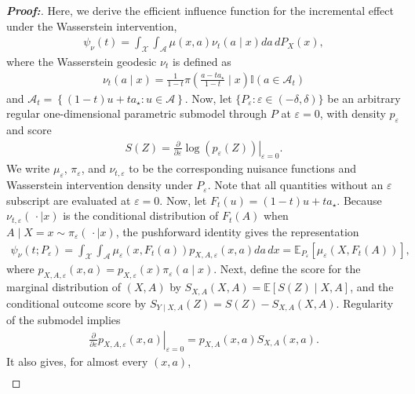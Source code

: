 \documentclass[11pt,twoside]{article}
\theoremstyle{definition}
\theoremstyle{remark}
\begin{document}
\begin{proof}[\textbf{Proof:}] Here, we derive the efficient influence function for the incremental effect under the Wasserstein intervention,
\begin{align*}
    \psi_\nu(t) = \int_{\mathcal{X}} \int_{\mathcal{A}} \mu(x, a) \nu_t(a \! \mid \! x) da \, dP_X(x),
\end{align*}
where the Wasserstein geodesic $\nu_t$ is defined as
\begin{align*}
     \nu_t(a \! \mid \! x) = \frac{1}{1 - t} \pi \left( \frac{a - t a_{\star}}{1 - t} \mid x\right) \mathbb{I}(a\in\mathcal{A}_{t})
\end{align*}
and $\mathcal{A}_t = \left\{(1-t)u+ta_\star:u\in\mathcal{A} \right\}$. Now, let $\{P_\varepsilon:\varepsilon\in(-\delta,\delta)\}$ be an arbitrary regular one-dimensional parametric submodel through $P$ at $\varepsilon=0$, with density $p_\varepsilon$ and score
\begin{align*}
    S(Z) = \left. \frac{\partial}{\partial\varepsilon} \log\left( p_\varepsilon(Z) \right) \right|_{\varepsilon=0}.
\end{align*}
We write $\mu_\varepsilon$, $\pi_\varepsilon$, and $\nu_{t,\varepsilon}$ to be the corresponding nuisance functions and Wasserstein intervention density under $P_\varepsilon$. Note that all quantities without an $\varepsilon$ subscript are evaluated at $\varepsilon=0$. Now, let $F_t(u) = (1-t)u+ta_\star$. Because $\nu_{t,\varepsilon}(\, \cdot\mid x)$ is the conditional distribution of $F_t(A)$ when $A\mid X=x\sim\pi_\varepsilon(\, \cdot\mid x)$, the pushforward identity gives the representation
\begin{align*}
    \psi_\nu(t;P_\varepsilon) = \int_{\mathcal{X}} \int_{\mathcal{A}} \mu_\varepsilon(x,F_t(a)) p_{X,A,\varepsilon}(x,a) da\,dx = \mathbb{E}_{P_\varepsilon} \! \left[ \mu_\varepsilon(X,F_t(A))\right],
\end{align*}
where $p_{X,A,\varepsilon}(x,a)=p_{X,\varepsilon}(x) \pi_\varepsilon(a\mid x)$. Next, define the score for the marginal distribution of $(X,A)$ by $S_{X,A}(X,A) = \mathbb{E}[S(Z)\mid X,A]$, and the conditional outcome score by $S_{Y\mid X,A}(Z) = S(Z)-S_{X,A}(X,A)$. Regularity of the submodel implies
\begin{align*}
    \left. \frac{\partial}{\partial\varepsilon} p_{X,A,\varepsilon}(x,a)\right|_{\varepsilon=0} = p_{X,A}(x,a)S_{X,A}(x,a).
\end{align*}
It also gives, for almost every $(x,a)$,
\begin{align*}

\end{align*}
\end{proof}
\end{document}
